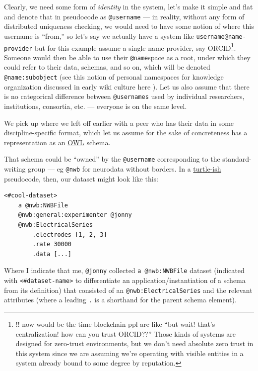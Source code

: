 \documentclass[10pt]{article}
\begin{document}
\begin{multicols}{2}
Clearly, we need some form of \emph{identity} in the system, let's make
it simple and flat and denote that in pseudocode as \texttt{@username}
--- in reality, without any form of distributed uniqueness checking, we
would need to have some notion of where this username is ``from,'' so
let's say we actually have a system like \texttt{username@name-provider}
but for this example assume a single name provider, say
ORCID\footnote{!! now would be the time blockchain ppl are like ``but
  wait! that's centralization! how can you trust ORCID??'' Those kinds
  of systems are designed for zero-trust environments, but we don't need
  absolute zero trust in this system since we are assuming we're
  operating with visible entities in a system already bound to some
  degree by reputation.}. Someone would then be able to use their
\texttt{@name}space as a root, under which they could refer to their
data, schemas, and so on, which will be denoted \texttt{@name:subobject}
(see this notion of personal namespaces for knowledge organization
discussed in early wiki culture here \cite{MeatballWikiPersonalCategories} ). Let us also assume that there is
no categorical difference between \texttt{@usernames} used by individual
researchers, institutions, consortia, etc. --- everyone is on the same
level.

We pick up where we left off earlier with a peer who has their data in
some discipline-specific format, which let us assume for the sake of
concreteness has a representation as an
\href{https://www.w3.org/OWL/}{OWL} schema.

That schema could be ``owned'' by the \texttt{@username} corresponding
to the standard-writing group --- eg \texttt{@nwb} for neurodata without
borders. In a \href{https://www.w3.org/TR/turtle/}{turtle-ish}
pseudocode, then, our dataset might look like this:

\begin{verbatim}
<#cool-dataset>
    a @nwb:NWBFile
    @nwb:general:experimenter @jonny
    @nwb:ElectricalSeries
        .electrodes [1, 2, 3]
        .rate 30000
        .data [...]
\end{verbatim}

Where I indicate that me, \texttt{@jonny} collected
\texttt{a\ @nwb:NWBFile} dataset (indicated with
\texttt{\textless{}\#dataset-name\textgreater{}} to differentiate an
application/instantiation of a schema from its definition) that
consisted of an \texttt{@nwb:ElectricalSeries} and the relevant
attributes (where a leading \texttt{.} is a shorthand for the parent
schema element).


\end{multicols}
\end{document}
